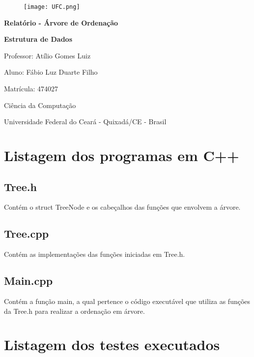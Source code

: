 \documentclass[a4paper,12pt]{article}
\begin{document}
\begin{center}

\begin{figure}

    \centering
    
    \texttt{[image: UFC.png]}

\end{figure}

\textbf{\Huge{Relatório - Árvore de Ordenação}}
\vspace{0.5cm}

\textbf{\Huge{Estrutura de Dados}}
\vspace{1cm}
    
    \Large {
    Professor: Atílio Gomes Luiz
    
    Aluno: Fábio Luz Duarte Filho
    
    Matrícula: 474027
    
    Ciência da Computação
    
    Universidade Federal do Ceará - Quixadá/CE - Brasil
    }
    
\end{center}

\vspace{1cm}

\section{Listagem dos programas em C++}
    \subsection{Tree.h}
        Contém o struct TreeNode e os cabeçalhos das funções que envolvem a árvore.
        
    \subsection{Tree.cpp}
        Contém as implementações das funções iniciadas em Tree.h.
        
    \subsection{Main.cpp}
        Contém a função main, a qual pertence o código executável que utiliza as funções da Tree.h para realizar a ordenação em árvore.
        
\section{Listagem dos testes executados}
\end{document}
